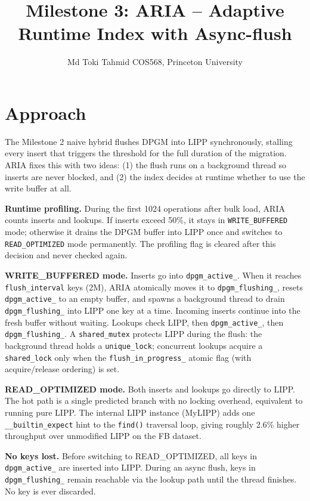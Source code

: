 \documentclass[11pt]{article}
\title{\vspace{-1em}\textbf{Milestone 3: ARIA -- Adaptive Runtime Index with Async-flush}\vspace{-0.5em}}
\author{Md Toki Tahmid \quad COS568, Princeton University}
\date{}
\begin{document}
\maketitle
\vspace{-1em}

\section*{Approach}

The Milestone 2 naive hybrid flushes DPGM into LIPP synchronously, stalling
every insert that triggers the threshold for the full duration of the migration.
ARIA fixes this with two ideas: (1) the flush runs on a background thread so
inserts are never blocked, and (2) the index decides at runtime whether to use
the write buffer at all.

\textbf{Runtime profiling.} During the first 1024 operations after bulk load,
ARIA counts inserts and lookups. If inserts exceed 50\%, it stays in
\texttt{WRITE\_BUFFERED} mode; otherwise it drains the DPGM buffer into LIPP
once and switches to \texttt{READ\_OPTIMIZED} mode permanently. The profiling
flag is cleared after this decision and never checked again.

\textbf{WRITE\_BUFFERED mode.} Inserts go into \texttt{dpgm\_active\_}.
When it reaches \texttt{flush\_interval} keys (2M), ARIA atomically moves it
to \texttt{dpgm\_flushing\_}, resets \texttt{dpgm\_active\_} to an empty
buffer, and spawns a background thread to drain \texttt{dpgm\_flushing\_} into
LIPP one key at a time. Incoming inserts continue into the fresh buffer without
waiting. Lookups check LIPP, then \texttt{dpgm\_active\_}, then
\texttt{dpgm\_flushing\_}. A \texttt{shared\_mutex} protects LIPP during the
flush: the background thread holds a \texttt{unique\_lock}; concurrent lookups
acquire a \texttt{shared\_lock} only when the \texttt{flush\_in\_progress\_}
atomic flag (with acquire/release ordering) is set.

\textbf{READ\_OPTIMIZED mode.} Both inserts and lookups go directly to LIPP.
The hot path is a single predicted branch with no locking overhead, equivalent
to running pure LIPP. The internal LIPP instance (MyLIPP) adds one
\texttt{\_\_builtin\_expect} hint to the \texttt{find()} traversal loop,
giving roughly 2.6\% higher throughput over unmodified LIPP on the FB dataset.

\textbf{No keys lost.} Before switching to READ\_OPTIMIZED, all keys in
\texttt{dpgm\_active\_} are inserted into LIPP. During an async flush, keys
in \texttt{dpgm\_flushing\_} remain reachable via the lookup path until the
thread finishes. No key is ever discarded.
\end{document}
